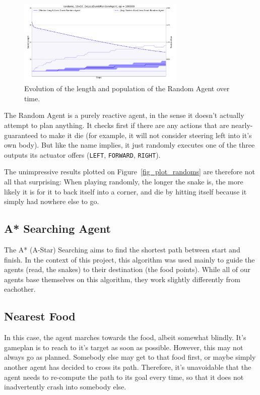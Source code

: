 \begin{figure}
\includegraphics[height=1.6in]{plot_randoms}
\caption{Evolution of the length and population of the Random Agent over time.}
\end{figure}

The Random Agent is a purely reactive agent, in the sense it doesn't actually attempt to plan anything.
It checks first if there are any actions that are nearly-guaranteed to make it die (for example, it will not consider steering left into it's own body).
But like the name implies, it just randomly executes one of the three outputs its actuator offers (\texttt{LEFT}, \texttt{FORWARD}, \texttt{RIGHT}).

The unimpressive results plotted on Figure~\ref{fig_plot_randoms} are therefore not all that surprising: When playing randomly,
the longer the snake is, the more likely it is for it to back itself into a corner, and die by hitting itself because it simply had nowhere else to go.

\subsection{A* Searching Agent}

The A* (A-Star) Searching aims to find the shortest path between start and finish. In the context of this project, this algorithm was used mainly to guide
the agents (read, the snakes) to their destination (the food points). While all of our agents base themselves on this algorithm, they work slightly
differently from eachother.

\subsection{Nearest Food}

In this case, the agent marches towards the food, albeit somewhat blindly. It's gameplan is to reach to it's target as soon as possible. However, this may
not always go as planned. Somebody else may get to that food first, or maybe simply another agent has decided to cross its path.
Therefore, it's unavoidable that the agent needs to re-compute the path to its goal every time, so that it does not inadvertently crash into somebody else.

